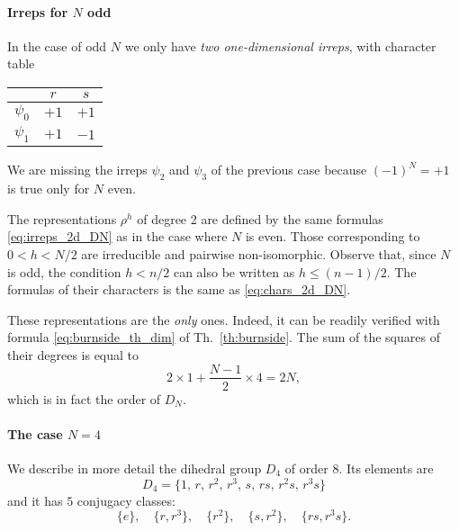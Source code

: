 \paragraph*{Irreps for $N$ odd}

In the case of odd $N$ we only have \emph{two one-dimensional irreps}, with character table

\begin{center}
    \begin{tabular}{ccc}
        \toprule
        & $r$ & $s$ \\
        \midrule
        $\psi_0$ & $+1$ & $+1$ \\
        $\psi_1$ & $+1$ & $-1$ \\
        \bottomrule
    \end{tabular}
\end{center}

We are missing the irreps $\psi_2$ and $\psi_3$ of the previous case because $(-1)^N = +1$ is true only for $N$ even.

The representations $\rho^h$ of degree 2 are defined by the same formulas \eqref{eq:irreps_2d_DN} as in the case where $N$ is even.
Those corresponding to $0 < h < N/2$ are irreducible and pairwise non-isomorphic.
Observe that, since $N$ is odd, the condition $h < n/2$ can also be written as $h \leq (n-1)/2$.
The formulas of their characters is the same as \eqref{eq:chars_2d_DN}.

These representations are the \emph{only} ones.
Indeed, it can be readily verified with formula \eqref{eq:burnside_th_dim} of Th.~\ref{th:burnside}.
The sum of the squares of their degrees is equal to
\begin{equation*}
    2 \times 1 + \frac{N-1}{2} \times 4 = 2N,
\end{equation*}
which is in fact the order of $D_N$.


\paragraph*{The case $N=4$}

We describe in more detail the dihedral group $D_4$ of order $8$.
Its elements are
\begin{equation*}
    D_4 = \{1,\, r,\, r^2,\, r^3,\, s,\, r s,\, r^2 s,\, r^3 s \}
\end{equation*}
and it has $5$ conjugacy classes:
\begin{equation*}
    \{e\}, \quad
    \{r,r^3\}, \quad
    \{r^2\}, \quad
    \{s,r^2\}, \quad
    \{rs,r^3s\}.
\end{equation*}

